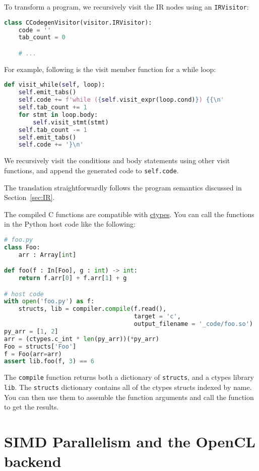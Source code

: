 To transform a program, we recursively visit the IR nodes using an \lstinline{IRVisitor}:
\begin{lstlisting}[language=python]
class CCodegenVisitor(visitor.IRVisitor):
    code = ''
    tab_count = 0

    # ...
\end{lstlisting}

For example, following is the visit member function for a while loop:
\begin{lstlisting}[language=python]
def visit_while(self, loop):
    self.emit_tabs()
    self.code += f'while ({self.visit_expr(loop.cond)}) {{\n'
    self.tab_count += 1
    for stmt in loop.body:
        self.visit_stmt(stmt)
    self.tab_count -= 1
    self.emit_tabs()
    self.code += '}\n'
\end{lstlisting}

We recursively visit the conditions and body statements using other visit functions, and append the generated code to \lstinline{self.code}.

The translation straightforwardly follows the program semantics discussed in Section~\ref{sec:IR}.

The compiled C functions are compatible with \href{https://docs.python.org/3/library/ctypes.html}{ctypes}. You can call the functions in the Python host code like the following:
\begin{lstlisting}[language=python]
# foo.py
class Foo:
    arr : Array[int]

def foo(f : In[Foo], g : int) -> int:
    return f.arr[0] + f.arr[1] + g

# host code
with open('foo.py') as f:
    structs, lib = compiler.compile(f.read(),
                                    target = 'c',
                                    output_filename = '_code/foo.so')
py_arr = [1, 2]
arr = (ctypes.c_int * len(py_arr))(*py_arr)
Foo = structs['Foo']
f = Foo(arr=arr)
assert lib.foo(f, 3) == 6
\end{lstlisting}

The \lstinline{compile} function returns both a dictionary of \lstinline{structs}, and a ctypes library \lstinline{lib}. The \lstinline{structs} dictionary contains all of the ctypes structs indexed by name. You can then use them to assemble the function arguments and call the function to get the results.

\section{SIMD Parallelism and the OpenCL backend}

